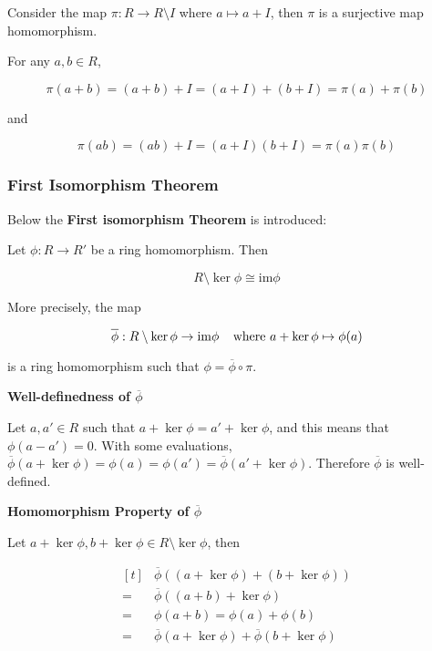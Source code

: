 \documentclass[a4paper,12pt]{article}
\begin{document}
\begin{pst}
  Consider the map $\pi:R\to R\setminus I$ where $a\mapsto a+I$, then $\pi$ is a surjective map homomorphism.\n

  \prf For any $a,b\in R$,

  $$\pi(a+b)=(a+b)+I=(a+I)+(b+I)=\pi(a)+\pi(b)$$\s

  and

  $$\pi(ab)=(ab)+I=(a+I)(b+I)=\pi(a)\pi(b)$$
\end{pst}

\subsubsection{First Isomorphism Theorem}
Below the \textbf{First isomorphism Theorem} is introduced:\n

\begin{thm}
  Let $\phi:R\to R'$ be a ring homomorphism. Then

  $$R\setminus\ker\phi\cong\mathrm{im}\phi$$\s

  More precisely, the map

  $$\overline{\phi}:R\setminus\ker\phi\to\mathrm{im}\phi\;\;\;\;\text{where }a+\ker\phi\mapsto\phi(a)$$\s

  is a ring homomorphism such that $\phi=\overline{\phi}\circ\pi$.\n

  \prf \begin{alist}
    \item \textbf{Well-definedness of $\overline{\phi}$}\n

    Let $a,a'\in R$ such that $a+\ker\phi=a'+\ker\phi$, and this means that $\phi(a-a')=0$. With some evaluations, $\overline{\phi}(a+\ker\phi)=\phi(a)=\phi(a')=\overline{\phi}(a'+\ker\phi)$. Therefore $\overline{\phi}$ is well-defined.

    \item \textbf{Homomorphism Property of $\overline{\phi}$}\n

    Let $a+\ker\phi,b+\ker\phi\in R\setminus\ker\phi$, then

    $$\begin{aligned}[t]
      &\overline{\phi}((a+\ker\phi)+(b+\ker\phi))\\
      =&\overline{\phi}((a+b)+\ker\phi)\\
      =&\phi(a+b)=\phi(a)+\phi(b)\\
      =&\overline{\phi}(a+\ker\phi)+\overline{\phi}(b+\ker\phi)
    \end{aligned}$$\s


\end{alist}
\end{thm}
\end{document}

